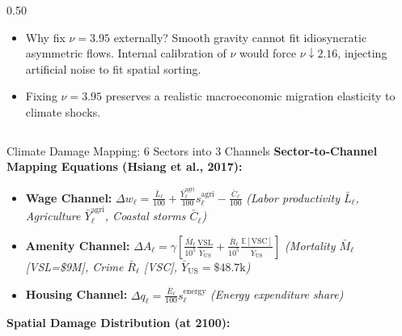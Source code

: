 \documentclass[aspectratio=169, 10pt]{beamer}
\begin{document}
\begin{frame}
\begin{columns}[T]
\begin{column}{0.50\textwidth}
\begin{tcolorbox}[leafbox, title=The Identification Challenge of $\nu$]
\begin{itemize}
                    \item Why fix $\nu = 3.95$ externally? Smooth gravity cannot fit idiosyncratic asymmetric flows. Internal calibration of $\nu$ would force $\nu \downarrow 2.16$, injecting artificial noise to fit spatial sorting.
                    \item Fixing $\nu = 3.95$ preserves a realistic macroeconomic migration elasticity to climate shocks.
                \end{itemize}
            \end{tcolorbox}
        \end{column}
    \end{columns}
\end{frame}

\begin{frame}{Climate Damage Mapping: 6 Sectors into 3 Channels \hfill \hyperlink{backup:damage_channels}{\scriptsize{}}}\label{main:damage_mapping}
    \textbf{\small Sector-to-Channel Mapping Equations (Hsiang et al., 2017):}
    \vspace{-0.1cm}
    \begin{itemize}\footnotesize\setlength{\itemsep}{1pt}
        \item \textbf{Wage Channel:} $\Delta w_\ell = \frac{\bar L_\ell}{100} + \frac{\bar Y_\ell^{\text{agri}}}{100} s_\ell^{\text{agri}} - \frac{\bar C_\ell}{100}$ \quad \textit{(Labor productivity $\bar{L}_\ell$, Agriculture $\bar{Y}_\ell^{\text{agri}}$, Coastal storms $\bar{C}_\ell$)}
        \item \textbf{Amenity Channel:} $\Delta A_\ell = \gamma \left[ \frac{\bar M_\ell}{10^5} \frac{\text{VSL}}{\bar Y_{\text{US}}} + \frac{\bar R_\ell}{10^5} \frac{\mathbb{E}[\text{VSC}]}{\bar Y_{\text{US}}} \right]$ \quad \textit{(Mortality $\bar{M}_\ell$ [VSL=\$9M], Crime $\bar{R}_\ell$ [VSC], $\bar Y_{\text{US}}=\$48.7\text{k}$)}
        \item \textbf{Housing Channel:} $\Delta q_\ell = \frac{\bar E_\ell}{100} s_\ell^{\text{energy}}$ \quad \textit{(Energy expenditure share)}
    \end{itemize}
    \vspace{0.04cm}
    \textbf{\footnotesize Spatial Damage Distribution (at 2100):}
    \vspace{0.02cm}
    \begin{center}
        \begin{minipage}{0.32\textwidth}
            \centering

\end{minipage}
\end{center}
\end{frame}
\end{document}
